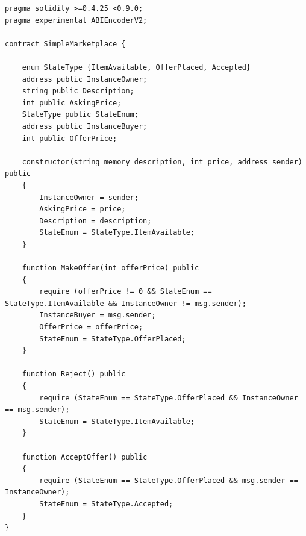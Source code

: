 \begin{lstlisting}[language=Solidity, label={fig:solidity-example}, caption={Contrato Inteligente \texttt{SimpleMarketplace} en Solidity},captionpos=b]
pragma solidity >=0.4.25 <0.9.0;
pragma experimental ABIEncoderV2;

contract SimpleMarketplace {

    enum StateType {ItemAvailable, OfferPlaced, Accepted}
    address public InstanceOwner;
    string public Description;
    int public AskingPrice;
    StateType public StateEnum;  
    address public InstanceBuyer;
    int public OfferPrice;

    constructor(string memory description, int price, address sender) public
    {
        InstanceOwner = sender;
        AskingPrice = price;
        Description = description;
        StateEnum = StateType.ItemAvailable;
    }

    function MakeOffer(int offerPrice) public
    {
        require (offerPrice != 0 && StateEnum == StateType.ItemAvailable && InstanceOwner != msg.sender);
        InstanceBuyer = msg.sender;
        OfferPrice = offerPrice;
        StateEnum = StateType.OfferPlaced;
    }

    function Reject() public
    {
        require (StateEnum == StateType.OfferPlaced && InstanceOwner == msg.sender);
        StateEnum = StateType.ItemAvailable;
    }

    function AcceptOffer() public
    {
        require (StateEnum == StateType.OfferPlaced && msg.sender == InstanceOwner);
        StateEnum = StateType.Accepted;
    }
}
\end{lstlisting}

